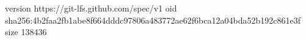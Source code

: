 version https://git-lfs.github.com/spec/v1
oid sha256:4b2faa2fb1abe8f664dddc97806a483772ae62f6bca12a04bda52b192c861e3f
size 138436
